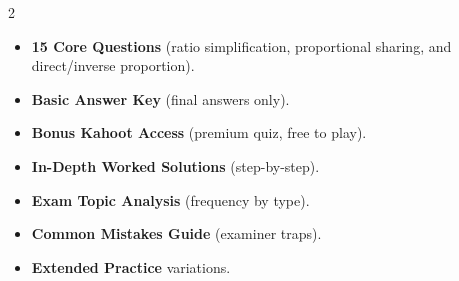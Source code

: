 \documentclass[11pt,a4paper]{article}
\newcommand{\FullReleaseDate}{April 30, 2026}
\begin{document}
\vspace{8pt}

\begin{multicols}{2}
  \begin{tcolorbox}[card, title=\sffamily\bfseries\textcolor{white}{\faHandPointDown\ TODAY (Simplified Version)}, colbacktitle=mainblue, boxed title style={sharp corners, boxrule=0pt}]
    \begin{itemize}[leftmargin=1.2em, itemsep=2pt]
      \item \small \textbf{15 Core Questions} (ratio simplification, proportional sharing, and direct/inverse proportion).
      \item \small \textbf{Basic Answer Key} (final answers only).
      \item \small \textbf{Bonus Kahoot Access} (premium quiz, free to play).
    \end{itemize}
  \end{tcolorbox}

  \columnbreak

  \begin{tcolorbox}[card, title=\sffamily\bfseries\textcolor{white}{\faRocket\ ON \FullReleaseDate\ (Full Upgrade)}, colbacktitle=mainblue, boxed title style={sharp corners, boxrule=0pt}]
    \begin{itemize}[leftmargin=1.2em, itemsep=2pt]
      \item \small \textbf{In-Depth Worked Solutions} (step-by-step).
      \item \small \textbf{Exam Topic Analysis} (frequency by type).
      \item \small \textbf{Common Mistakes Guide} (examiner traps).
      \item \small \textbf{Extended Practice} variations.
    \end{itemize}
  \end{tcolorbox}
\end{multicols}
\end{document}
